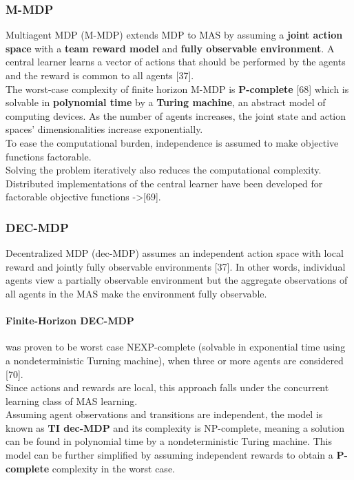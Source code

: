\documentclass{article}
\begin{document}
			\subsubsection{M-MDP} Multiagent  MDP (M-MDP) extends MDP to MAS by assuming a \textbf{joint action space} with a \textbf{team reward model} and \textbf{fully observable environment}. A central learner learns a vector of actions that should be performed by the agents and the reward is common to all agents \cite{rizk-2018-decision-making-in-multiagent-systems-a-survey}[37].
			\\
			The worst-case complexity of finite horizon M-MDP is \textbf{P-complete} \cite{rizk-2018-decision-making-in-multiagent-systems-a-survey}[68] which is solvable in \textbf{polynomial time} by a \textbf{Turing machine}, an abstract model of computing devices. As the number of agents increases, the joint state and action spaces’ dimensionalities increase exponentially. 
			\\
			To ease the computational burden, independence is assumed to make objective functions factorable. 
			\\
			Solving the problem iteratively also reduces the computational complexity. 
			\\
			Distributed implementations of the central learner have been developed for factorable objective functions \citep{rizk-2018-decision-making-in-multiagent-systems-a-survey}->[69]. 
			\subsubsection{DEC-MDP} 
			Decentralized MDP (dec-MDP) assumes an independent action space with local reward and jointly fully observable environments \citep{rizk-2018-decision-making-in-multiagent-systems-a-survey}[37]. In other words, individual agents view a partially observable environment but the aggregate observations of all agents in the MAS make the environment fully observable. 
				\paragraph{Finite-Horizon DEC-MDP} was proven to be worst
				case NEXP-complete (solvable in exponential time using a
				nondeterministic Turning machine), when three or more agents
				are considered \citet{rizk-2018-decision-making-in-multiagent-systems-a-survey}[70]. 
				\\
				Since actions and rewards are local, this approach falls under the concurrent learning class of MAS learning.
				\\
				Assuming agent observations and transitions are independent, the model is known as \textbf{TI dec-MDP} and its complexity is NP-complete, meaning a solution can be found in polynomial time by a nondeterministic Turing machine. This model can be further simplified by assuming independent rewards to obtain a \textbf{P-complete} complexity in the worst case.
		
\end{document}
